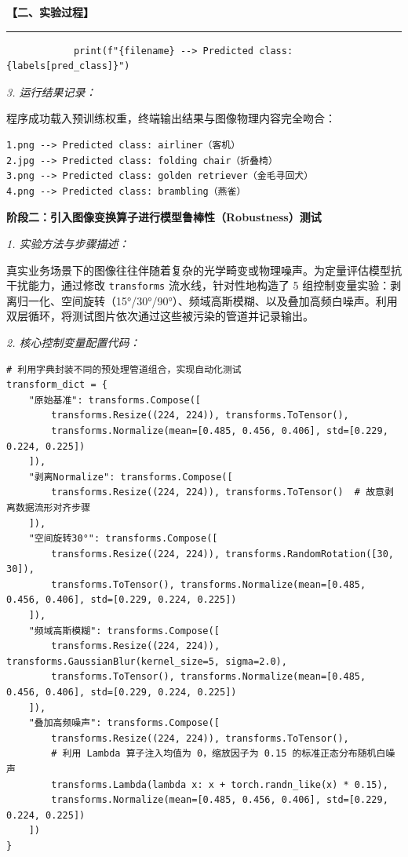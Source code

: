 \documentclass[a4paper,12pt]{article}
\newenvironment{sectionbox}[1]
{%
    \begin{center}
    \fboxrule=1pt
    \fboxsep=8pt
    \begin{minipage}{0.98\textwidth}
    \textbf{#1}
    \par\vspace{4pt}
    \hrule
    \vspace{6pt}
}
{%
    \end{minipage}
    \end{center}
}
\begin{document}
\begin{sectionbox}{【二、实验过程】}
\begin{lstlisting}
            print(f"{filename} --> Predicted class: {labels[pred_class]}")
\end{lstlisting}

\vspace{4pt}
\textit{3. 运行结果记录：}

程序成功载入预训练权重，终端输出结果与图像物理内容完全吻合：

\begin{verbatim}
1.png --> Predicted class: airliner（客机）
2.jpg --> Predicted class: folding chair（折叠椅）
3.png --> Predicted class: golden retriever（金毛寻回犬）
4.png --> Predicted class: brambling（燕雀）
\end{verbatim}

\vspace{6pt}
\textbf{阶段二：引入图像变换算子进行模型鲁棒性（Robustness）测试}

\vspace{4pt}
\textit{1. 实验方法与步骤描述：}

真实业务场景下的图像往往伴随着复杂的光学畸变或物理噪声。为定量评估模型抗干扰能力，通过修改 \texttt{transforms} 流水线，针对性地构造了 5 组控制变量实验：剥离归一化、空间旋转（15°/30°/90°）、频域高斯模糊、以及叠加高频白噪声。利用双层循环，将测试图片依次通过这些被污染的管道并记录输出。

\vspace{4pt}
\textit{2. 核心控制变量配置代码：}

\begin{lstlisting}
# 利用字典封装不同的预处理管道组合，实现自动化测试
transform_dict = {
    "原始基准": transforms.Compose([
        transforms.Resize((224, 224)), transforms.ToTensor(),
        transforms.Normalize(mean=[0.485, 0.456, 0.406], std=[0.229, 0.224, 0.225])
    ]),
    "剥离Normalize": transforms.Compose([
        transforms.Resize((224, 224)), transforms.ToTensor()  # 故意剥离数据流形对齐步骤
    ]),
    "空间旋转30°": transforms.Compose([
        transforms.Resize((224, 224)), transforms.RandomRotation([30, 30]),
        transforms.ToTensor(), transforms.Normalize(mean=[0.485, 0.456, 0.406], std=[0.229, 0.224, 0.225])
    ]),
    "频域高斯模糊": transforms.Compose([
        transforms.Resize((224, 224)), transforms.GaussianBlur(kernel_size=5, sigma=2.0),
        transforms.ToTensor(), transforms.Normalize(mean=[0.485, 0.456, 0.406], std=[0.229, 0.224, 0.225])
    ]),
    "叠加高频噪声": transforms.Compose([
        transforms.Resize((224, 224)), transforms.ToTensor(),
        # 利用 Lambda 算子注入均值为 0，缩放因子为 0.15 的标准正态分布随机白噪声
        transforms.Lambda(lambda x: x + torch.randn_like(x) * 0.15),
        transforms.Normalize(mean=[0.485, 0.456, 0.406], std=[0.229, 0.224, 0.225])
    ])
}
\end{lstlisting}


\end{sectionbox}
\end{document}
